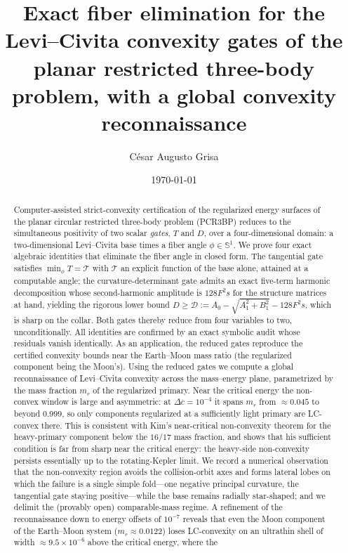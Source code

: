 \documentclass[11pt,reqno]{amsart}
\theoremstyle{plain}
\theoremstyle{definition}
\newcommand{\Sph}{\mathbb{S}}
\newcommand{\calT}{\mathcal{T}}
\newcommand{\calD}{\mathcal{D}}
\begin{document}
\title[Exact fiber elimination for the PCR3BP convexity gates]{Exact fiber elimination for the Levi--Civita convexity gates of the planar restricted three-body problem, with a global convexity reconnaissance}

\author{C\'esar Augusto Grisa}
\address{Instituto de Computa\c{c}\~ao, Universidade Federal Fluminense, Niter\'oi, RJ, Brazil}

\date{\today}


\begin{abstract}
Computer-assisted strict-convexity certification of the regularized energy surfaces of the planar circular restricted three-body problem (PCR3BP) reduces to the simultaneous positivity of two scalar \emph{gates}, $T$ and $D$, over a four-dimensional domain: a two-dimensional Levi--Civita base times a fiber angle $\phi\in\Sph^1$. We prove four exact algebraic identities that eliminate the fiber angle in closed form. The tangential gate satisfies $\min_\phi T = \calT$ with $\calT$ an explicit function of the base alone, attained at a computable angle; the curvature-determinant gate admits an exact five-term harmonic decomposition whose second-harmonic amplitude is $128F^2 s$ for the structure matrices at hand, yielding the rigorous lower bound $D\ge \calD := A_0-\sqrt{A_1^2+B_1^2}-128F^2 s$, which is sharp on the collar. Both gates thereby reduce from four variables to two, unconditionally. All identities are confirmed by an exact symbolic audit whose residuals vanish identically. As an application, the reduced gates reproduce the certified convexity bounds near the Earth--Moon mass ratio (the regularized component being the Moon's). Using the reduced gates we compute a global reconnaissance of Levi--Civita convexity across the mass--energy plane, parametrized by the mass fraction $m_r$ of the regularized primary. Near the critical energy the non-convex window is large and asymmetric: at $\Delta c=10^{-4}$ it spans $m_r$ from $\approx 0.045$ to beyond $0.999$, so only components regularized at a sufficiently light primary are LC-convex there. This is consistent with Kim's near-critical non-convexity theorem for the heavy-primary component below the $16/17$ mass fraction, and shows that his sufficient condition is far from sharp near the critical energy: the heavy-side non-convexity persists essentially up to the rotating-Kepler limit. We record a numerical observation that the non-convexity region avoids the collision-orbit axes and forms lateral lobes on which the failure is a single simple fold---one negative principal curvature, the tangential gate staying positive---while the base remains radially star-shaped; and we delimit the (provably open) comparable-mass regime. A refinement of the reconnaissance down to energy offsets of $10^{-7}$ reveals that even the Moon component of the Earth--Moon system ($m_r\approx 0.0122$) loses LC-convexity on an ultrathin shell of width $\approx 9.5\times 10^{-6}$ above the critical energy, where the 
\end{abstract}
\end{document}
